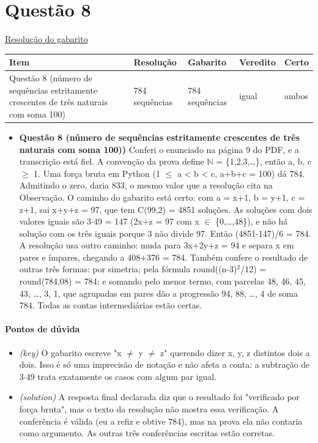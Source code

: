 \documentclass{article}%
\begin{document}
\section*{Questão 8}%
\href{https://poliedroresolve.sistemapoliedro.com.br/vestibulares/ita/2026/ita-2-fase-dia-1-28-10-2025-2-fase-dia-1/dissertativa-8-matematica-2-fase-dia-1-ita-2026}{Resolução do gabarito}\par\smallskip%
\begin{longtable}{@{}p{} p{} p{} p{} p{}@{}}\toprule Item & Resolução & Gabarito & Veredito & Certo \\ \midrule
Questão 8 (número de sequências estritamente crescentes de três naturais com soma 100) & 784 sequências & 784 sequências & igual & ambos \\
\bottomrule\end{longtable}%
\begin{itemize}%
\item%
\textbf{Questão 8 (número de sequências estritamente crescentes de três naturais com soma 100))} Conferi o enunciado na página 9 do PDF, e a transcrição está fiel. A convenção da prova define $\mathbb{N}$ = \{1,2,3,\ldots{}\}, então a, b, c $\geq$ 1. Uma força bruta em Python (1 $\leq$ a < b < c, a+b+c = 100) dá 784. Admitindo o zero, daria 833, o mesmo valor que a resolução cita na Observação. O caminho do gabarito está certo: com a = x+1, b = y+1, c = z+1, sai x+y+z = 97, que tem C(99,2) = 4851 soluções. As soluções com dois valores iguais são 3$\cdot$49 = 147 (2x+z = 97 com x $\in$ \{0,\ldots{},48\}), e não há solução com os três iguais porque 3 não divide 97. Então (4851-147)/6 = 784. A resolução usa outro caminho: muda para 3x+2y+z = 94 e separa x em pares e ímpares, chegando a 408+376 = 784. Também confere o resultado de outras três formas: por simetria; pela fórmula round((n-3)$^2$/12) = round(784,08) = 784; e somando pelo menor termo, com parcelas 48, 46, 45, 43, \ldots{}, 3, 1, que agrupadas em pares dão a progressão 94, 88, \ldots{}, 4 de soma 784. Todas as contas intermediárias estão certas.%
\end{itemize}%
\paragraph{Pontos de dúvida}%
\begin{itemize}%
\item%
\textit{(key)} O gabarito escreve "x $\neq$ y $\neq$ z" querendo dizer x, y, z distintos dois a dois. Isso é só uma imprecisão de notação e não afeta a conta: a subtração de 3$\cdot$49 trata exatamente os casos com algum par igual.%
\item%
\textit{(solution)} A resposta final declarada diz que o resultado foi "verificado por força bruta", mas o texto da resolução não mostra essa verificação. A conferência é válida (eu a refiz e obtive 784), mas na prova ela não contaria como argumento. As outras três conferências escritas estão corretas.%
\end{itemize}%
\end{document}
